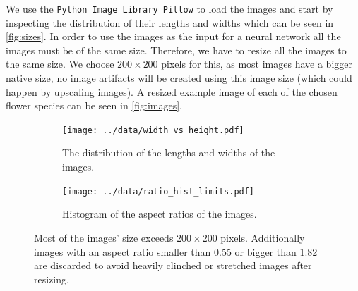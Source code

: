 We use the \texttt{Python Image Library Pillow} \cite{pillow} to load the images and start by inspecting the distribution of their lengths and widths which can be seen in \autoref{fig:sizes}.
In order to use the images as the input for a neural network all the images must be of the same size. 
Therefore, we have to resize all the images to the same size.
We choose $200\times200$ pixels for this, as most images have a bigger native size, no image artifacts will be created using this image size (which could happen by upscaling images).
A resized example image of each of the chosen flower species can be seen in \autoref{fig:images}.
\begin{figure}
    \centering    
    \begin{subfigure}{0.49\textwidth}
        \centering
        \texttt{[image: ../data/width\_vs\_height.pdf]}
        \caption{The distribution of the lengths and widths of the images.}
        \label{fig:sizes}
    \end{subfigure}
    \hfill
    \begin{subfigure}{0.49\textwidth}
        \centering
        \texttt{[image: ../data/ratio\_hist\_limits.pdf]}
        \caption{Histogram of the aspect ratios of the images.}
        \label{fig:ratio}
    \end{subfigure}
    \caption{Most of the images' size exceeds $200\times200$ pixels. 
        Additionally images with an aspect ratio smaller than 0.55 or bigger than 1.82 are discarded to avoid heavily clinched or stretched images after resizing. }
\end{figure}

